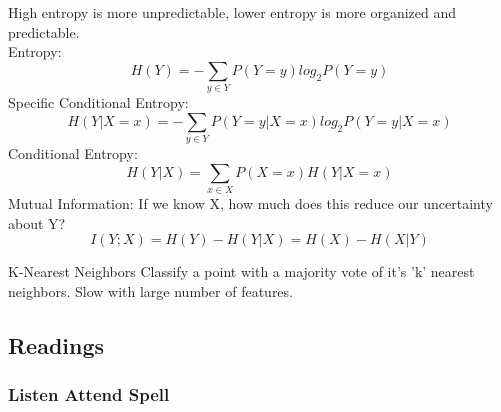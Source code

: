 \documentclass{article}
\begin{document}
\begin{definition}[Entropy]
    High entropy is more unpredictable, lower entropy is more organized and predictable.\\
    Entropy: 
    \[H(Y) = - \sum_{y \in Y} P(Y = y) log_2 P(Y = y)\]
    Specific Conditional Entropy: 
    \[H(Y | X = x) = -\sum_{y \in Y} P(Y = y | X = x)log_2 P(Y = y | X = x)\]
    Conditional Entropy: 
    \[H(Y|X) = \sum_{x \in X} P(X = x)H(Y|X=x)\]
    Mutual Information: If we know X, how much does this reduce our uncertainty about Y?
    \[ I(Y;X) = H(Y) - H(Y|X) = H(X) - H(X|Y)\]
\end{definition}

\begin{subsection}{K-Nearest Neighbors}
    Classify a point with a majority vote of it's 'k' nearest neighbors. Slow with large number of features. 
\end{subsection}

\subsection{Readings}
\subsubsection{Listen Attend Spell}
\end{document}
